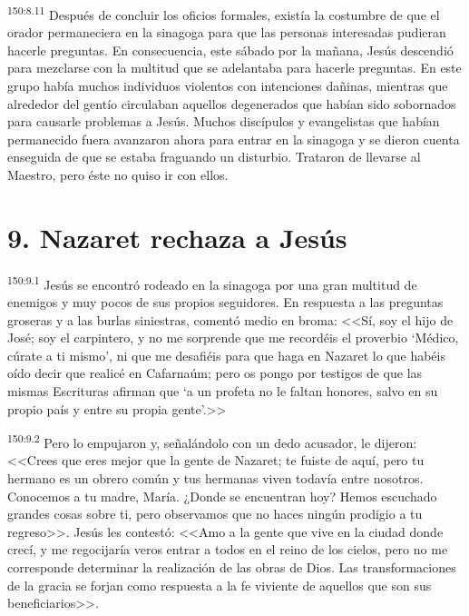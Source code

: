 \par 
\textsuperscript{150:8.11} Después de concluir los oficios formales, existía la costumbre de que el orador permaneciera en la sinagoga para que las personas interesadas pudieran hacerle preguntas. En consecuencia, este sábado por la mañana, Jesús descendió para mezclarse con la multitud que se adelantaba para hacerle preguntas. En este grupo había muchos individuos violentos con intenciones dañinas, mientras que alrededor del gentío circulaban aquellos degenerados que habían sido sobornados para causarle problemas a Jesús. Muchos discípulos y evangelistas que habían permanecido fuera avanzaron ahora para entrar en la sinagoga y se dieron cuenta enseguida de que se estaba fraguando un disturbio. Trataron de llevarse al Maestro, pero éste no quiso ir con ellos.

\section*{9. Nazaret rechaza a Jesús}
\par 
\textsuperscript{150:9.1} Jesús se encontró rodeado en la sinagoga por una gran multitud de enemigos y muy pocos de sus propios seguidores. En respuesta a las preguntas groseras y a las burlas siniestras, comentó medio en broma: <<Sí, soy el hijo de José; soy el carpintero, y no me sorprende que me recordéis el proverbio `Médico, cúrate a ti mismo', ni que me desafiéis para que haga en Nazaret lo que habéis oído decir que realicé en Cafarnaúm; pero os pongo por testigos de que las mismas Escrituras afirman que `a un profeta no le faltan honores, salvo en su propio país y entre su propia gente'.>>

\par 
\textsuperscript{150:9.2} Pero lo empujaron y, señalándolo con un dedo acusador, le dijeron: <<Crees que eres mejor que la gente de Nazaret; te fuiste de aquí, pero tu hermano es un obrero común y tus hermanas viven todavía entre nosotros. Conocemos a tu madre, María. ¿Donde se encuentran hoy? Hemos escuchado grandes cosas sobre ti, pero observamos que no haces ningún prodigio a tu regreso>>. Jesús les contestó: <<Amo a la gente que vive en la ciudad donde crecí, y me regocijaría veros entrar a todos en el reino de los cielos, pero no me corresponde determinar la realización de las obras de Dios. Las transformaciones de la gracia se forjan como respuesta a la fe viviente de aquellos que son sus beneficiarios>>.

